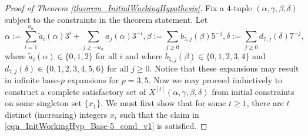 \documentclass[12pt]{article}
\begin{document}
\begin{proof}[Proof of Theorem \ref{theorem_InitialWorkingHypothesis}]
Fix a $4$-tuple $(\alpha,\gamma,\beta,\delta)$ subject to the constraints in the theorem statement. 
Let 
\[
\alpha := \sum_{i=1}^{u_{\alpha}} \widetilde{a}_i(\alpha) 3^i + \sum_{j \geq -u_{\alpha}} a_j(\alpha) 3^{-i}, 
\beta := \sum_{j \geq 0} b_{5,j}(\beta) 5^{-j}, 
\delta := \sum_{j \geq 0} d_{7,j}(\delta) 7^{-j}, 
\] 
where $\widetilde{a}_i(\alpha) \in \{0,1,2\}$ for all $i$ and where 
$b_{5,j}(\beta) \in \{0,1,2,3,4\}$ and $d_{7,j}(\delta) \in \{0,1,2,3,4,5,6\}$ for all $j \geq 0$. 
Notice that these expansions may result in infinite 
base-$p$ expansions for $p=3,5$. Now we may proceed inductively to construct a complete satisfactory set 
of $X^{[t]}(\alpha,\gamma,\beta,\delta)$ from initial constraints on some singleton set $\{x_1\}$. 
We must first show that for some $t \geq 1$, there are $t$ distinct (increasing) integers $x_i$ such that the 
claim in \eqref{eqn_InitWorkingHyp_Base-5_cond_v1} is satisfied. 


\end{proof}
\end{document}
